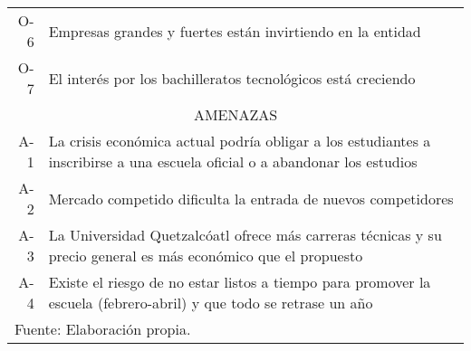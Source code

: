 \begin{table}[h!]
\begin{tabular}{r|p{5in}}
    	O-6 & Empresas grandes y fuertes están invirtiendo en la entidad \\
    	O-7 & El interés por los bachilleratos tecnológicos está creciendo \\
    	\hline
    	\multicolumn{2}{c}{AMENAZAS} \\
    	\hline
    	\hline
    	A-1 & La crisis económica actual podría obligar a los estudiantes a inscribirse a una escuela oficial o a abandonar los estudios \\
    	A-2 & Mercado competido dificulta la entrada de nuevos competidores \\
    	A-3 & La Universidad Quetzalcóatl ofrece más carreras técnicas y su precio general es más económico que el propuesto \\
    	A-4 & Existe el riesgo de no estar listos a tiempo para promover la escuela (febrero-abril) y que todo se retrase un año \\
    	\hline
    	\multicolumn{2}{l}{\footnotesize Fuente: Elaboración propia.} \\
    \end{tabular}
\end{table}

